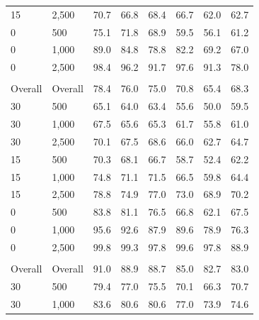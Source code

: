 \documentclass[twoside,11pt]{article}\usepackage[]{graphicx}\usepackage[]{xcolor}
\newenvironment{knitrout}{}{} %
\begin{document}
\begin{knitrout}
\begin{landscape}
\begin{longtable}[t]{llcccccc}
\hspace{1em}15 & 2,500 & 70.7 & 66.8 & 68.4 & 66.7 & 62.0 & 62.7\\
\hspace{1em}0 & 500 & 75.1 & 71.8 & 68.9 & 59.5 & 56.1 & 61.2\\
\hspace{1em}0 & 1,000 & 89.0 & 84.8 & 78.8 & 82.2 & 69.2 & 67.0\\
\hspace{1em}0 & 2,500 & 98.4 & 96.2 & 91.7 & 97.6 & 91.3 & 78.0\\
\addlinespace[0.3em]
\multicolumn{8}{l}{\textit{\textbf{Combination effects}}}\\
\hline
\hspace{1em}Overall & Overall & 78.4 & 76.0 & 75.0 & 70.8 & 65.4 & 68.3\\
\hspace{1em}30 & 500 & 65.1 & 64.0 & 63.4 & 55.6 & 50.0 & 59.5\\
\hspace{1em}30 & 1,000 & 67.5 & 65.6 & 65.3 & 61.7 & 55.8 & 61.0\\
\hspace{1em}30 & 2,500 & 70.1 & 67.5 & 68.6 & 66.0 & 62.7 & 64.7\\
\hspace{1em}15 & 500 & 70.3 & 68.1 & 66.7 & 58.7 & 52.4 & 62.2\\
\hspace{1em}15 & 1,000 & 74.8 & 71.1 & 71.5 & 66.5 & 59.8 & 64.4\\
\hspace{1em}15 & 2,500 & 78.8 & 74.9 & 77.0 & 73.0 & 68.9 & 70.2\\
\hspace{1em}0 & 500 & 83.8 & 81.1 & 76.5 & 66.8 & 62.1 & 67.5\\
\hspace{1em}0 & 1,000 & 95.6 & 92.6 & 87.9 & 89.6 & 78.9 & 76.3\\
\hspace{1em}0 & 2,500 & 99.8 & 99.3 & 97.8 & 99.6 & 97.8 & 88.9\\
\addlinespace[0.3em]
\multicolumn{8}{l}{\textit{\textbf{Main effects}}}\\
\hline
\hspace{1em}Overall & Overall & 91.0 & 88.9 & 88.7 & 85.0 & 82.7 & 83.0\\
\hspace{1em}30 & 500 & 79.4 & 77.0 & 75.5 & 70.1 & 66.3 & 70.7\\
\hspace{1em}30 & 1,000 & 83.6 & 80.6 & 80.6 & 77.0 & 73.9 & 74.6\\

\end{longtable}
\end{landscape}
\end{knitrout}
\end{document}
